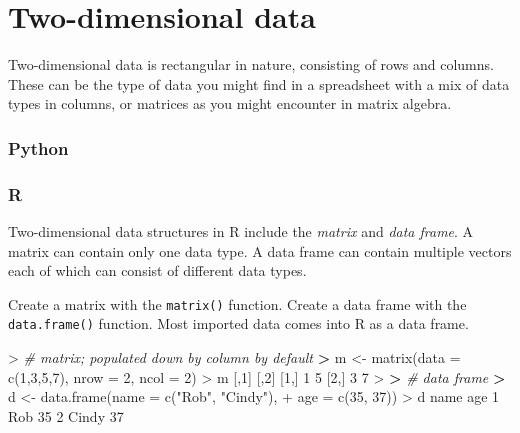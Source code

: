 \documentclass[
]{book}
\newenvironment{Shaded}{\begin{snugshade}}{\end{snugshade}}
\newcommand{\AttributeTok}[1]{\textcolor[rgb]{0.77,0.63,0.00}{#1}}
\newcommand{\CommentTok}[1]{\textcolor[rgb]{0.56,0.35,0.01}{\textit{#1}}}
\newcommand{\DecValTok}[1]{\textcolor[rgb]{0.00,0.00,0.81}{#1}}
\newcommand{\ErrorTok}[1]{\textcolor[rgb]{0.64,0.00,0.00}{\textbf{#1}}}
\newcommand{\FunctionTok}[1]{\textcolor[rgb]{0.00,0.00,0.00}{#1}}
\newcommand{\NormalTok}[1]{#1}
\newcommand{\OtherTok}[1]{\textcolor[rgb]{0.56,0.35,0.01}{#1}}
\newcommand{\SpecialCharTok}[1]{\textcolor[rgb]{0.00,0.00,0.00}{#1}}
\newcommand{\StringTok}[1]{\textcolor[rgb]{0.31,0.60,0.02}{#1}}
\begin{document}
\hypertarget{two-dimensional-data}{%
\section{Two-dimensional data}\label{two-dimensional-data}}

Two-dimensional data is rectangular in nature, consisting of rows and columns. These can be the type of data you might find in a spreadsheet with a mix of data types in columns, or matrices as you might encounter in matrix algebra.

\hypertarget{python-8}{%
\subsubsection*{Python}\label{python-8}}

\hypertarget{r-8}{%
\subsubsection*{R}\label{r-8}}

Two-dimensional data structures in R include the \emph{matrix} and \emph{data frame}. A matrix can contain only one data type. A data frame can contain multiple vectors each of which can consist of different data types.

Create a matrix with the \texttt{matrix()} function. Create a data frame with the \texttt{data.frame()} function. Most imported data comes into R as a data frame.

\begin{Shaded}
\begin{Highlighting}[]
\SpecialCharTok{\textgreater{}} \CommentTok{\# matrix; populated down by column by default}
\ErrorTok{\textgreater{}}\NormalTok{ m }\OtherTok{\textless{}{-}} \FunctionTok{matrix}\NormalTok{(}\AttributeTok{data =} \FunctionTok{c}\NormalTok{(}\DecValTok{1}\NormalTok{,}\DecValTok{3}\NormalTok{,}\DecValTok{5}\NormalTok{,}\DecValTok{7}\NormalTok{), }\AttributeTok{nrow =} \DecValTok{2}\NormalTok{, }\AttributeTok{ncol =} \DecValTok{2}\NormalTok{)}
\SpecialCharTok{\textgreater{}}\NormalTok{ m}
\NormalTok{     [,}\DecValTok{1}\NormalTok{] [,}\DecValTok{2}\NormalTok{]}
\NormalTok{[}\DecValTok{1}\NormalTok{,]    }\DecValTok{1}    \DecValTok{5}
\NormalTok{[}\DecValTok{2}\NormalTok{,]    }\DecValTok{3}    \DecValTok{7}
\SpecialCharTok{\textgreater{}} 
\ErrorTok{\textgreater{}} \CommentTok{\# data frame}
\ErrorTok{\textgreater{}}\NormalTok{ d }\OtherTok{\textless{}{-}} \FunctionTok{data.frame}\NormalTok{(}\AttributeTok{name =} \FunctionTok{c}\NormalTok{(}\StringTok{"Rob"}\NormalTok{, }\StringTok{"Cindy"}\NormalTok{),}
\SpecialCharTok{+}                 \AttributeTok{age =} \FunctionTok{c}\NormalTok{(}\DecValTok{35}\NormalTok{, }\DecValTok{37}\NormalTok{))}
\SpecialCharTok{\textgreater{}}\NormalTok{ d}
\NormalTok{   name age}
\DecValTok{1}\NormalTok{   Rob  }\DecValTok{35}
\DecValTok{2}\NormalTok{ Cindy  }\DecValTok{37}
\end{Highlighting}
\end{Shaded}
\end{document}
